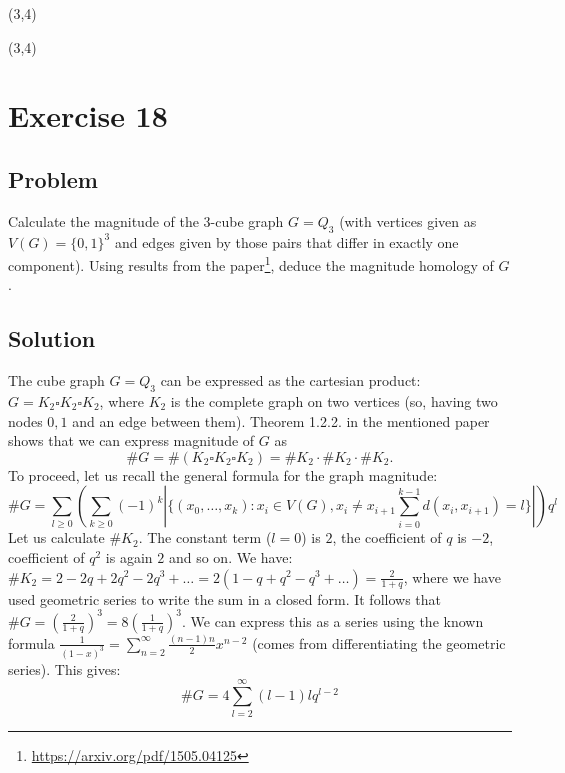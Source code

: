 \documentclass{article}
\begin{document}
\noindent
(3,4)

\noindent
(3,4)
\newpage
\section*{Exercise 18}
\subsection*{Problem}
Calculate the magnitude of the 3-cube graph $G=Q_3$ (with vertices given as $V(G) = \{0,1\}^3$ and edges given by those pairs that differ in exactly one component). Using results from the paper\footnote{\url{https://arxiv.org/pdf/1505.04125}}, deduce the magnitude homology of $G$.
\subsection*{Solution}
The cube graph $G=Q_3$ can be expressed as the cartesian product: $G=K_2 \square K_2 \square K_2$, where $K_2$ is the complete graph on two vertices (so, having two nodes $0,1$ and an edge between them).
Theorem 1.2.2. in the mentioned paper shows that we can express magnitude of $G$ as
\begin{equation*}
\#G = \#(K_2 \square K_2 \square K_2) = \#K_2 \cdot \#K_2 \cdot \#K_2.
\end{equation*}
To proceed, let us recall the general formula for the graph magnitude:
\begin{equation*}
\#G = \sum_{l \geq 0}\left(\sum_{k \geq 0}(-1)^k \left| \{(x_0,\dots,x_k) : x_i \in V(G), x_i \neq x_{i+1} \sum_{i=0}^{k-1} d(x_i,x_{i+1}) = l \} \right| \right) q^l
\end{equation*}
Let us calculate $\#K_2$. The constant term ($l=0$) is $2$, the coefficient of $q$ is $-2$, coefficient of $q^2$ is again $2$ and so on.
We have: $\#K_2 = 2-2q+2q^2-2q^3+\dots = 2(1-q+q^2-q^3+\dots) = \frac{2}{1+q}$, where we have used geometric series to write the sum in a closed form.
It follows that $\#G = (\frac{2}{1+q})^3 = 8(\frac{1}{1+q})^3$.
We can express this as a series using the known formula $\frac{1}{(1-x)^3} = \sum_{n=2}^\infty \frac{(n-1)n}{2} x^{n-2}$ (comes from differentiating the geometric series).
This gives:
\begin{equation*}
\#G = 4 \sum_{l=2}^\infty (l-1)l q^{l-2}
\end{equation*}
\end{document}
